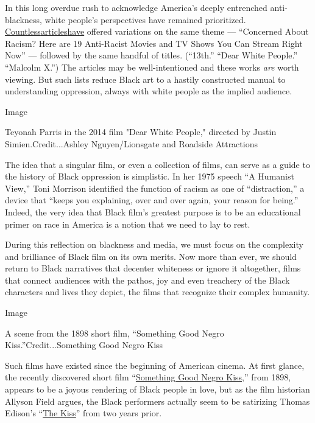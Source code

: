 In this long overdue rush to acknowledge America's deeply entrenched
anti-blackness, white people's perspectives have remained prioritized.
\href{https://www.esquire.com/entertainment/g32799997/black-movies-shows-on-netflix/}{Countless}\href{https://www.vanityfair.com/hollywood/2020/06/the-help-netflix-watch-list}{articles}\href{https://www.digitaltrends.com/movies/best-black-movies-on-netflix/}{have}
offered variations on the same theme --- ``Concerned About Racism? Here
are 19 Anti-Racist Movies and TV Shows You Can Stream Right Now'' ---
followed by the same handful of titles. (``13th.'' ``Dear White
People.'' ``Malcolm X.'') The articles may be well-intentioned and these
works \emph{are} worth viewing. But such lists reduce Black art to a
hastily constructed manual to understanding oppression, always with
white people as the implied audience.

Image

Teyonah Parris in the 2014 film "Dear White People," directed by Justin
Simien.Credit...Ashley Nguyen/Lionsgate and Roadside Attractions

The idea that a singular film, or even a collection of films, can serve
as a guide to the history of Black oppression is simplistic. In her 1975
speech ``A Humanist View,'' Toni Morrison identified the function of
racism as one of ``distraction,'' a device that ``keeps you explaining,
over and over again, your reason for being.'' Indeed, the very idea that
Black film's greatest purpose is to be an educational primer on race in
America is a notion that we need to lay to rest.

During this reflection on blackness and media, we must focus on the
complexity and brilliance of Black film on its own merits. Now more than
ever, we should return to Black narratives that decenter whiteness or
ignore it altogether, films that connect audiences with the pathos, joy
and even treachery of the Black characters and lives they depict, the
films that recognize their complex humanity.

Image

A scene from the 1898 short film, ``Something Good Negro
Kiss.''Credit...Something Good Negro Kiss

Such films have existed since the beginning of American cinema. At first
glance, the recently discovered short film
``\href{https://www.youtube.com/watch?v=LIKU5kncg8U}{Something Good
Negro Kiss,}'' from 1898, appears to be a joyous rendering of Black
people in love, but as the film historian Allyson Field argues, the
Black performers actually seem to be satirizing Thomas Edison's
``\href{https://www.youtube.com/watch?v=IUyTcpvTPu0}{The Kiss}'' from
two years prior.

